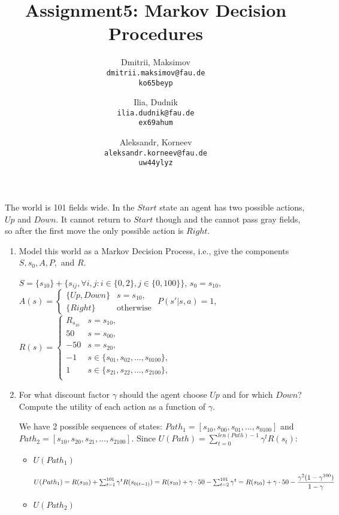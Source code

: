 \documentclass{homework}
\title{Assignment5: Markov Decision Procedures}
\author{
  Dmitrii, Maksimov\\
  \texttt{dmitrii.maksimov@fau.de} \\
  \texttt{ko65beyp}
  \and
  Ilia, Dudnik\\
  \texttt{ilia.dudnik@fau.de}\\
  \texttt{ex69ahum}
  \and
  Aleksandr, Korneev\\
  \texttt{aleksandr.korneev@fau.de}\\
  \texttt{uw44ylyz}
}
\begin{document}
\maketitle

The world is 101 fields wide. In the $Start$ state an agent has two possible actions, $Up$ and $Down$. It cannot return to $Start$ though and the cannot pass gray fields, so after the first move the only possible action is $Right$.
\begin{enumerate}
	\item Model this world as a Markov Decision Process, i.e., give the components $S,s_0,A, P,$ and $R$.

	$S = \{s_{10}\} + \{ s_{ij}, \forall i,j: i \in \{0, 2\}, j\in \{0, 100\}\}$,
\newline $s_0 = s_{10}$,
\newline $A(s) = 
\begin{cases} 
     \{Up, Down\} & s =  s_{10},\\
      \{Right\} & \text{otherwise}
\end{cases}
$
\newline $P(s'|s, a) = 1$,
\newline $R(s) = 
\begin{cases} 
     R_{s_{10}} & s =  s_{10},\\
     50& s =  s_{00},\\
     -50& s =  s_{20},\\
     -1& s \in  \{s_{01}, s_{02}, \ldots, s_{0100}\},\\
     1& s \in  \{s_{21}, s_{22}, \ldots, s_{2100}\},\\
\end{cases}
$
\item For what discount factor $\gamma$ should the agent choose $Up$ and for which $Down$? Compute the utility of each action as a function of $\gamma$.

We have 2 possible sequences of states: $Path_1 = [s_{10}, s_{00},s_{01}, \ldots, s_{0100}]$ and $Path_2 = [s_{10}, s_{20},s_{21}, \ldots, s_{2100}]$. Since $U(Path) = \sum_{t=0}^{len(Path) - 1} \gamma^tR(s_t)$:
\begin{itemize}
	\item $U(Path_1)$
	
	$U(Path_1) = R(s_{10}) + \sum_{t=1}^{101} \gamma^tR(s_{0(t-1)}) = R(s_{10}) + \gamma \cdot50 - \sum_{t=2}^{101} \gamma^t = \newline R(s_{10}) + \gamma \cdot50 - \dfrac{\gamma^2(1 - \gamma^{100})}{1 -  \gamma}$
	\item $U(Path_2)$
	

\end{itemize}
\end{enumerate}
\end{document}
